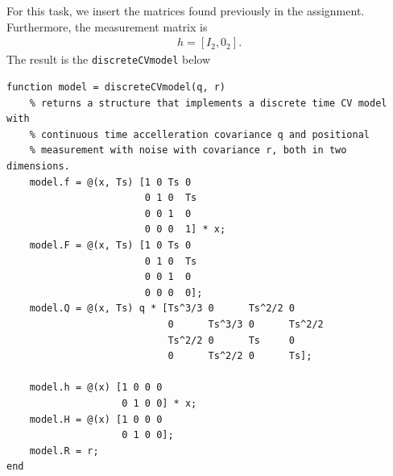 \documentclass[]{article}
\begin{document}
\section{}
For this task, we insert the matrices found previously in the assignment. Furthermore, the measurement matrix is
\begin{equation}\begin{aligned}
h = [I_2, 0_2].
\end{aligned}\end{equation}
The result is the \texttt{discreteCVmodel} below
\begin{lstlisting}
function model = discreteCVmodel(q, r)
    % returns a structure that implements a discrete time CV model with
    % continuous time accelleration covariance q and positional
    % measurement with noise with covariance r, both in two dimensions.
    model.f = @(x, Ts) [1 0 Ts 0
                        0 1 0  Ts
                        0 0 1  0
                        0 0 0  1] * x;
    model.F = @(x, Ts) [1 0 Ts 0
                        0 1 0  Ts
                        0 0 1  0
                        0 0 0  0];
    model.Q = @(x, Ts) q * [Ts^3/3 0      Ts^2/2 0
                            0      Ts^3/3 0      Ts^2/2
                            Ts^2/2 0      Ts     0
                            0      Ts^2/2 0      Ts];

    model.h = @(x) [1 0 0 0
                    0 1 0 0] * x;
    model.H = @(x) [1 0 0 0
                    0 1 0 0];
    model.R = r;
end
\end{lstlisting}

\section{}
\end{document}
